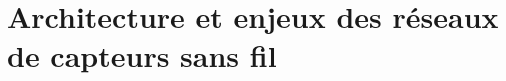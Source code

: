 \chapter{Architecture et enjeux des réseaux de capteurs sans fil}\label{chap:st}

\renewcommand\chapterpath{Main/Structure}
\renewcommand\chapterfig{Main/Structure/Figures}



